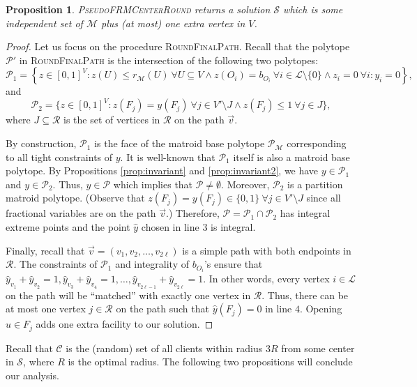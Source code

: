 \documentclass[a4paper,11pt]{article}
\newtheorem{proposition}[theorem]{Proposition}
\newcommand{\C}{\mathcal{C}}
\renewcommand{\S}{\mathcal{S}}
\newcommand{\R}{\mathcal{R}}
\newcommand{\M}{\mathcal{M}}
\renewcommand{\L}{\mathcal{L}}
\renewcommand{\P}{\mathcal{P}}
\begin{document}
\begin{proposition} \textsc{PseudoFRMCenterRound} returns a solution $\S$ which is some independent set of $\M$ plus (at most) one extra vertex in $V$.
\label{prop:feasibility}
\end{proposition}
\begin{proof}
Let us focus on the procedure \textsc{RoundFinalPath}. Recall that the polytope $\P'$ in \textsc{RoundFinalPath} is the intersection of the following two polytopes: 
$$\P_1 =  \left\{z \in [0,1]^V: z(U) \leq r_\M(U) ~\forall U \subseteq V \wedge z(O_i) = b_{O_i}  ~\forall i \in \L\setminus\{0\} \wedge z_i=0 ~\forall i:y_i=0 \right\},$$
and
$$\P_2 = \{z \in [0,1]^V:  z(F_j) = y(F_j) ~\forall j \in V'\setminus J \wedge z(F_j) \leq 1 ~\forall j \in J \},$$ 
where $J \subseteq \R$ is the set of vertices in $\R$ on the path $\vec{v}$.

By construction, $\P_1$ is the face of the matroid base polytope $\P_\M$ corresponding to all tight constraints of $y$. It is well-known that $\P_1$ itself is also a matroid base polytope. By Propositions \ref{prop:invariant} and \ref{prop:invariant2}, we have $y \in \P_1$ and $y \in \P_2$. Thus, $y \in \P$ which implies that $\P \neq \emptyset$. Moreover, $\P_2$ is a partition matroid polytope. (Observe that $z(F_j) = y(F_j) \in \{0,1\} ~\forall j \in V' \setminus J$ since all fractional variables are on the path $\vec{v}$.) Therefore, $\P = \P_1 \cap \P_2$ has integral extreme points and the point $\hat{y}$ chosen in line $3$ is integral.

Finally, recall that $\vec{v} = (v_1, v_2, \ldots, v_{2\ell})$ is a simple path with both endpoints in $\R$. The constraints of $\P_1$ and integrality of $b_{O_i}$'s ensure that $\hat{y}_{v_1}+\hat{y}_{v_2}=1, \hat{y}_{v_3}+\hat{y}_{v_4}=1, \ldots, \hat{y}_{v_{2\ell-1}}+\hat{y}_{v_{2\ell}}=1$. In other words, every vertex $i \in \L$ on the path will be ``matched'' with exactly one vertex in $\R$. Thus, there can be at most one vertex $j \in \R$ on the path such that $\hat{y}(F_j) = 0$ in line $4$. Opening $u \in F_j$ adds one extra facility to our solution.
\end{proof}

Recall that $\C$ is the (random) set of all clients within radius $3R$ from some center in $\S$, where $R$ is the optimal radius. The following two propositions will conclude our analysis.
\end{document}
